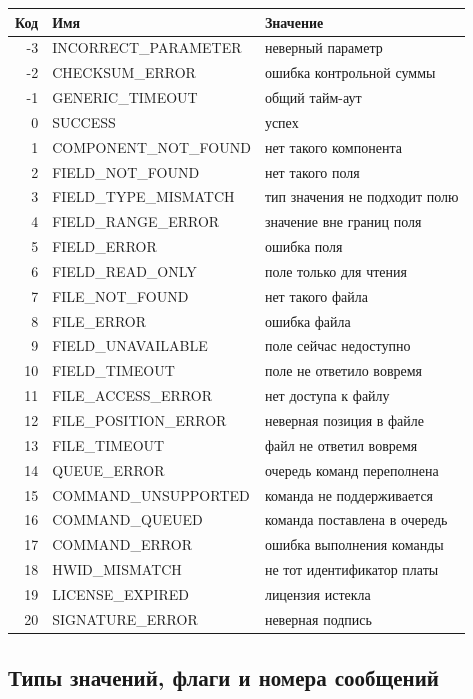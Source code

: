 \begin{center}
\small
\begin{tabularx}{\linewidth}{@{}r >{\ttfamily}l X@{}}
\toprule
\textbf{Код} & \textrm{\textbf{Имя}} & \textbf{Значение} \\
\midrule
-3 & INCORRECT\_PARAMETER & неверный параметр \\
-2 & CHECKSUM\_ERROR & ошибка контрольной суммы \\
-1 & GENERIC\_TIMEOUT & общий тайм-аут \\
0 & SUCCESS & успех \\
1 & COMPONENT\_NOT\_FOUND & нет такого компонента \\
2 & FIELD\_NOT\_FOUND & нет такого поля \\
3 & FIELD\_TYPE\_MISMATCH & тип значения не подходит полю \\
4 & FIELD\_RANGE\_ERROR & значение вне границ поля \\
5 & FIELD\_ERROR & ошибка поля \\
6 & FIELD\_READ\_ONLY & поле только для чтения \\
7 & FILE\_NOT\_FOUND & нет такого файла \\
8 & FILE\_ERROR & ошибка файла \\
9 & FIELD\_UNAVAILABLE & поле сейчас недоступно \\
10 & FIELD\_TIMEOUT & поле не ответило вовремя \\
11 & FILE\_ACCESS\_ERROR & нет доступа к файлу \\
12 & FILE\_POSITION\_ERROR & неверная позиция в файле \\
13 & FILE\_TIMEOUT & файл не ответил вовремя \\
14 & QUEUE\_ERROR & очередь команд переполнена \\
15 & COMMAND\_UNSUPPORTED & команда не поддерживается \\
16 & COMMAND\_QUEUED & команда поставлена в очередь \\
17 & COMMAND\_ERROR & ошибка выполнения команды \\
18 & HWID\_MISMATCH & не тот идентификатор платы \\
19 & LICENSE\_EXPIRED & лицензия истекла \\
20 & SIGNATURE\_ERROR & неверная подпись \\
\bottomrule
\end{tabularx}
\end{center}

\subsection*{Типы значений, флаги и номера сообщений}

